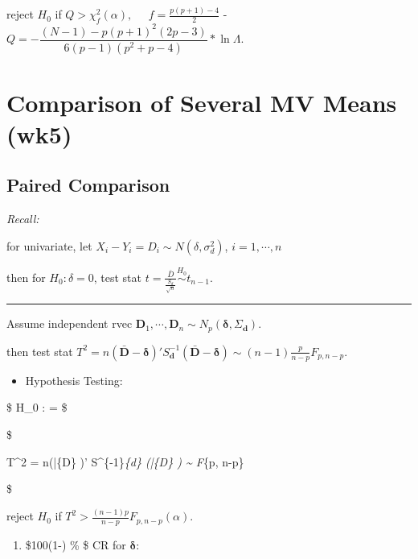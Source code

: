 \documentclass[
]{book}
\providecommand{\tightlist}{%
  \setlength{\itemsep}{0pt}\setlength{\parskip}{0pt}}
\begin{document}
{{{reject \(H_0\) if \(Q> \chi_f^2 (\alpha), \; \; \; \; \; f= \tfrac{p(p+1)-4}{2}\)
- \(Q = -\dfrac{(N-1)-p(p+1)^2(2p-3)}{6(p-1)(p^2+p-4)} \ast \ln\Lambda\).

\hypertarget{comparison-of-several-mv-means-wk5}{%
\section{Comparison of Several MV Means (wk5)}\label{comparison-of-several-mv-means-wk5}}

\hypertarget{paired-comparison}{%
\subsection{Paired Comparison}\label{paired-comparison}}

\emph{Recall:}

for univariate, let \(X_i - Y_i = D_i \sim N(\delta, \sigma_d^2)\), \(i=1, \cdots, n\)

then for \(H_0 : \delta = 0\), test stat \(t = \tfrac{\bar D}{\tfrac{S_d}{\sqrt{n}}} \overset {H_0}{\sim} t_{n-1}\).

\begin{center}\rule{0.5\linewidth}{0.5pt}\end{center}

Assume independent rvec \(\pmb D_1 , \cdots, \pmb D_n \sim N_p (\pmb \delta , \Sigma_{\pmb d})\).

then test stat \(T^2 = n(\bar {\pmb D} - \pmb \delta)' S^{-1}_{\pmb d} (\bar {\pmb D} - \pmb \delta) \sim (n-1)\tfrac{p}{n-p} F_{p, n-p}\).

\begin{itemize}
\tightlist
\item
  Hypothesis Testing:
\end{itemize}

\$
H\_0 : \pmb \delta = 
\$

\$

T\^{}2 = n(\bar \{\pmb D\} )' S\^{}\{-1\}\emph{\{\pmb d\} (\bar \{\pmb D\} ) \sim {} F}\{p, n-p\}

\$

reject \(H_0\) if \(T^2 > \tfrac{(n-1)p}{n-p} F_{p, n-p} (\alpha)\).

\begin{enumerate}
\def\labelenumi{\arabic{enumi})}
\tightlist
\item
  \$100(1-\alpha) \% \$ CR for \(\pmb \delta\):
\end{enumerate}

}}}
\end{document}
